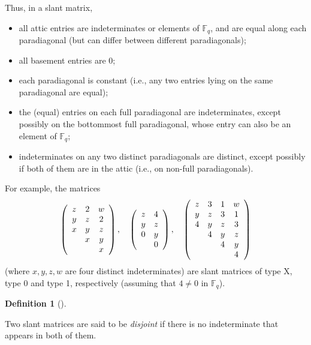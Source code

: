\documentclass[numbers=enddot,12pt,final,onecolumn,notitlepage]{scrartcl}%
\theoremstyle{definition}
\newtheorem{defi}[theo]{Definition}
\newenvironment{definition}[1][]
{\begin{defi}[#1]\begin{leftbar}}
{\end{leftbar}\end{defi}}
\newcommand{\Fq}{\mathbb{F}_q}
\theoremstyle{plainsl}
\begin{document}
Thus, in a slant matrix,

\begin{itemize}
\item all attic entries are indeterminates or elements of $\Fq$,
and are equal along each paradiagonal (but can differ between different paradiagonals);

\item all basement entries are $0$;

\item each paradiagonal is constant (i.e., any two entries lying on the same
paradiagonal are equal);

\item the (equal) entries on each full paradiagonal are indeterminates, except
possibly on the bottommost full paradiagonal, whose entry can also be an
element of $\Fq$;

\item indeterminates on any two distinct paradiagonals are distinct, except
possibly if both of them are in the attic (i.e., on non-full paradiagonals).
\end{itemize}

For example, the matrices%
\[
\left(
\begin{array}
[c]{ccc}%
z & 2 & w\\
y & z & 2\\
x & y & z\\
& x & y\\
&  & x
\end{array}
\right)  ,\ \ \ \left(
\begin{array}
[c]{cc}%
z & 4\\
y & z\\
0 & y\\
& 0
\end{array}
\right)  ,\ \ \ \left(
\begin{array}
[c]{cccc}%
z & 3 & 1 & w\\
y & z & 3 & 1\\
4 & y & z & 3\\
& 4 & y & z\\
&  & 4 & y\\
&  &  & 4
\end{array}
\right)
\]
(where $x,y,z,w$ are four distinct indeterminates) are slant matrices of type
X, type 0 and type 1, respectively (assuming that $4\neq0$ in $\Fq$).

\begin{definition}
Two slant matrices are said to be \emph{disjoint} if there is no indeterminate
that appears in both of them.
\end{definition}
\end{document}
